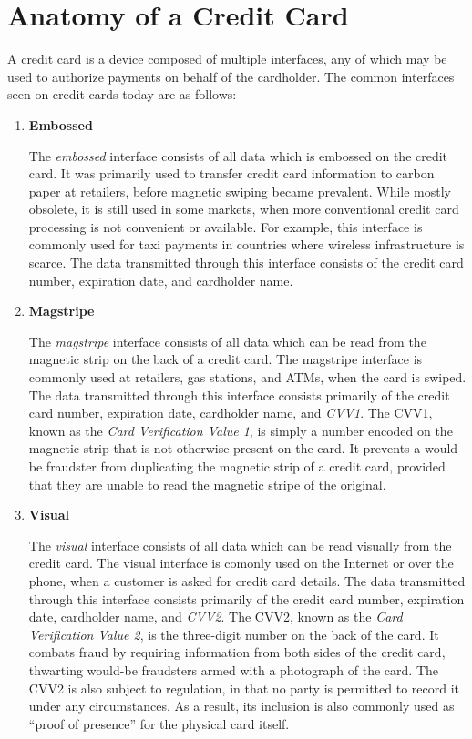 \section{Anatomy of a Credit Card}

A credit card is a device composed of multiple interfaces, any of which may be used to authorize payments on behalf of the cardholder.
The common interfaces seen on credit cards today are as follows:

\begin{enumerate}
\item \textbf{Embossed}

The \emph{embossed} interface consists of all data which is embossed on the credit card.
It was primarily used to transfer credit card information to carbon paper at retailers, before magnetic swiping became prevalent.
While mostly obsolete, it is still used in some markets, when more conventional credit card processing is not convenient or available.
For example, this interface is commonly used for taxi payments in countries where wireless infrastructure is scarce.
The data transmitted through this interface consists of the credit card number, expiration date, and cardholder name.

\item \textbf{Magstripe}

The \emph{magstripe} interface consists of all data which can be read from the magnetic strip on the back of a credit card.
The magstripe interface is commonly used at retailers, gas stations, and ATMs, when the card is swiped.
The data transmitted through this interface consists primarily of the credit card number, expiration date, cardholder name, and \emph{CVV1}.
The CVV1, known as the \emph{Card Verification Value 1}, is simply a number encoded on the magnetic strip that is not otherwise present on the card.
It prevents a would-be fraudster from duplicating the magnetic strip of a credit card, provided that they are unable to read the magnetic stripe of the original.

\item \textbf{Visual}

The \emph{visual} interface consists of all data which can be read visually from the credit card.
The visual interface is comonly used on the Internet or over the phone, when a customer is asked for credit card details.
The data transmitted through this interface consists primarily of the credit card number, expiration date, cardholder name, and \emph{CVV2}.
The CVV2, known as the \emph{Card Verification Value 2}, is the three-digit number on the back of the card.
It combats fraud by requiring information from both sides of the credit card, thwarting would-be fraudsters armed with a photograph of the card.
The CVV2 is also subject to regulation, in that no party is permitted to record it under any circumstances.
As a result, its inclusion is also commonly used as ``proof of presence'' for the physical card itself.


\end{enumerate}
